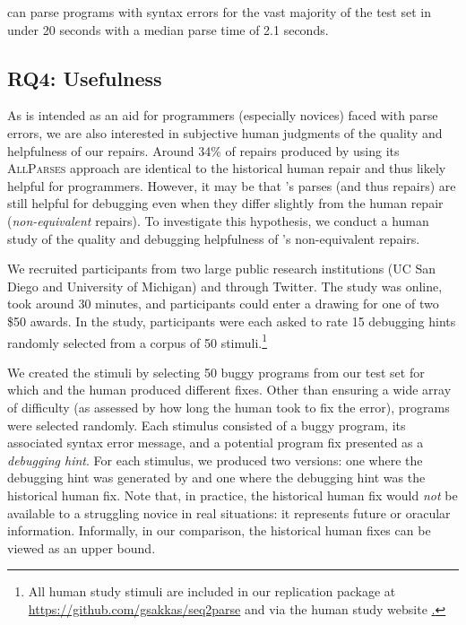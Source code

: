 \begin{framed}
  \noindent \toolname can parse programs with syntax errors for the vast
  majority of the test set in under 20 seconds with a median parse time of 2.1
  seconds.
\end{framed}

\subsection{RQ4: Usefulness}
\label{sec:eval:useful}


As \toolname is intended as an aid for programmers (especially novices) faced
with parse errors, we are also interested in subjective human judgments of the
quality and helpfulness of our repairs. Around 34\% of repairs produced by
\toolname using its \textsc{AllParses} approach are identical to the historical
human repair and thus likely helpful for programmers. However, it may be that
\toolname's parses (and thus repairs) are still helpful for debugging even when
they differ slightly from the human repair (\ie \textit{non-equivalent}
repairs). To investigate this hypothesis, we conduct a human study of the
quality and debugging helpfulness of \toolname's non-equivalent repairs.

 We recruited participants from two large public
research institutions (UC San Diego and University of Michigan) and through
Twitter. The study was online, took around 30 minutes, and participants could
enter a drawing for one of two \$50 awards. In the study, participants were each
asked to rate 15 debugging hints randomly selected from a corpus of 50
stimuli.\footnote{All human study stimuli are included in our replication
package at \url{https://github.com/gsakkas/seq2parse} and via the human study
website 
\href{https://dijkstra.eecs.umich.edu/~endremad/APR_HumanEval/}.}

We created the stimuli by selecting 50 buggy programs from our test set for
which \toolname and the human produced different fixes. Other than ensuring a
wide array of difficulty (as assessed by how long the human took to fix the
error), programs were selected randomly. Each stimulus consisted of a buggy
program, its associated syntax error message, and a potential program fix
presented as a \emph{debugging hint}. For each stimulus, we produced two
versions: one where the debugging hint was generated by \toolname and one where
the debugging hint was the historical human fix. Note that, in practice, the
historical human fix would \emph{not} be available to a struggling novice
in real situations: it represents future or oracular information. Informally, in
our comparison, the historical human fixes can be viewed as an upper bound.

